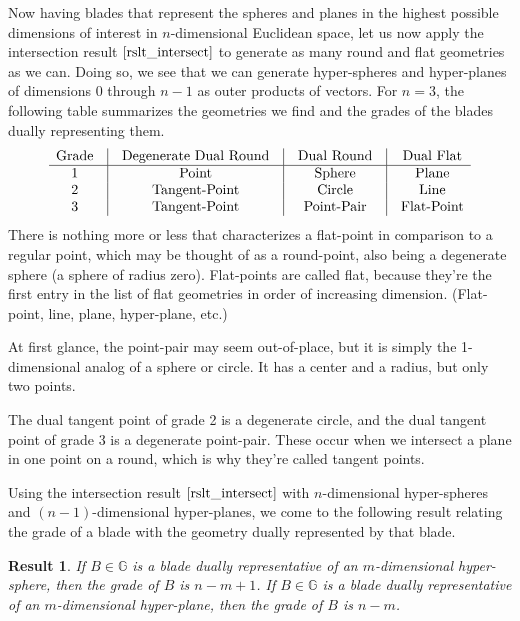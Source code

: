 \documentclass[12pt]{article}
\newcommand{\G}{\mathbb{G}}
\newtheorem{result}{Result}[section]
\begin{document}
Now having blades that represent the spheres and planes in the highest possible
dimensions of interest in $n$-dimensional Euclidean space, let us now apply
the intersection result $\eqref{rslt_intersect}$ to generate as many round
and flat geometries as we can.  Doing so, we see that we can generate
hyper-spheres and hyper-planes of dimensions $0$ through $n-1$ as
outer products of vectors.  For $n=3$, the following table summarizes
the geometries we find and the grades of the blades dually representing them.
\begin{equation*}
\begin{array}{ccccccc}
\mbox{Grade} & \vline & \mbox{Degenerate Dual Round} & \vline & \mbox{Dual Round} & \vline & \mbox{Dual Flat} \\
\hline
1 & \vline & \mbox{Point} & \vline & \mbox{Sphere} & \vline & \mbox{Plane} \\
2 & \vline & \mbox{Tangent-Point} & \vline & \mbox{Circle} & \vline & \mbox{Line} \\
3 & \vline & \mbox{Tangent-Point} & \vline & \mbox{Point-Pair} & \vline & \mbox{Flat-Point}
\end{array}
\end{equation*}
There is nothing more or less that characterizes a flat-point in comparison
to a regular point, which may be thought of as a round-point, also being
a degenerate sphere (a sphere of radius zero).  Flat-points are called flat,
because they're the first entry in the list of flat geometries in order of
increasing dimension.  (Flat-point, line, plane, hyper-plane, etc.)

At first glance, the point-pair may seem out-of-place, but it is simply
the 1-dimensional analog of a sphere or circle.  It has a center and
a radius, but only two points.

The dual tangent point of grade 2 is a degenerate
circle, and the dual tangent point of grade 3 is a degenerate point-pair.
These occur when we intersect a plane in one point on a round,
which is why they're called tangent points.

Using the intersection result $\eqref{rslt_intersect}$ with $n$-dimensional hyper-spheres
and $(n-1)$-dimensional hyper-planes, we come to the following result relating the grade of a blade
with the geometry dually represented by that blade.
\begin{result}\label{rslt_intersect_grades}
If $B\in\G$ is a blade dually representative of an $m$-dimensional
hyper-sphere, then the grade of $B$ is $n-m+1$.  If $B\in\G$ is a blade
dually representative of an $m$-dimensional hyper-plane, then the
grade of $B$ is $n-m$.
\end{result}
\end{document}

